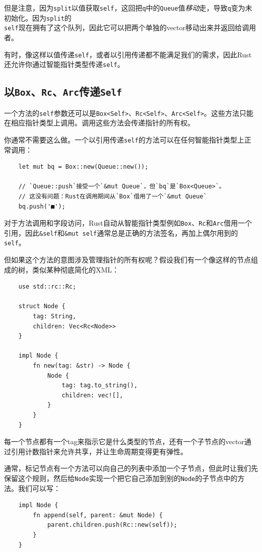 但是注意，因为\texttt{split}以值获取\texttt{self}，这回把\texttt{q}中的\texttt{Queue}值\emph{移动}走，导致\texttt{q}变为未初始化。因为\texttt{split}的\\
\texttt{self}现在拥有了这个队列，因此它可以把两个单独的vector移动出来并返回给调用者。

有时，像这样以值传递\texttt{self}，或者以引用传递都不能满足我们的需求，因此Rust还允许你通过智能指针类型传递\texttt{self}。

\subsection{以\texttt{Box}、\texttt{Rc}、\texttt{Arc}传递\texttt{Self}}

一个方法的\texttt{self}参数还可以是\texttt{Box<Self>}、\texttt{Rc<Self>}、\texttt{Arc<Self>}。这些方法只能在相应指针类型上调用。调用这些方法会传递指针的所有权。

你通常不需要这么做。一个以引用传递\texttt{self}的方法可以在任何智能指针类型上正常调用：
\begin{verbatim}
    let mut bq = Box::new(Queue::new());

    // `Queue::push`接受一个`&mut Queue`，但`bq`是`Box<Queue>`。
    // 这没有问题：Rust在调用期间从`Box`借用了一个`&mut Queue`
    bq.push('■');
\end{verbatim}

对于方法调用和字段访问，Rust自动从智能指针类型例如\texttt{Box}、\texttt{Rc}和\texttt{Arc}借用一个引用，因此\texttt{\&self}和\texttt{\&mut self}通常总是正确的方法签名，再加上偶尔用到的\texttt{self}。

但如果这个方法的意图涉及管理指针的所有权呢？假设我们有一个像这样的节点组成的树，类似某种彻底简化的XML：
\begin{verbatim}
    use std::rc::Rc;

    struct Node {
        tag: String,
        children: Vec<Rc<Node>>
    }

    impl Node {
        fn new(tag: &str) -> Node {
            Node {
                tag: tag.to_string(),
                children: vec![],
            }
        }
    }
\end{verbatim}

每一个节点都有一个tag来指示它是什么类型的节点，还有一个子节点的vector通过引用计数指针来允许共享，并让生命周期变得更有弹性。

通常，标记节点有一个方法可以向自己的列表中添加一个子节点，但此时让我们先保留这个规则，然后给\texttt{Node}实现一个把它自己添加到别的\texttt{Node}的子节点中的方法。我们可以写：
\begin{verbatim}
    impl Node {
        fn append(self, parent: &mut Node) {
            parent.children.push(Rc::new(self));
        }
    }
\end{verbatim}

